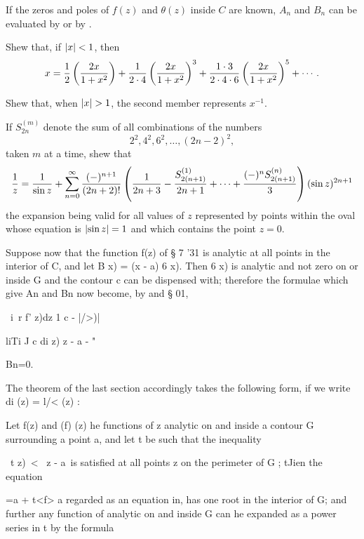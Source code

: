 If the zeros and poles of $f(z)$ and $\theta(z)$ inside $C$ are known,
$A_{n}$ and $B_{n}$ can be evaluated by or
by .

\begin{wandwexample}
  Shew that, if $\left| x \right| < 1$, then
  $$
  x
  =
  \frac{1}{2} \left(  \frac{2x}{1+x^{2}}  \right)
  +
  \frac{1}{2 \cdot 4} \left(  \frac{2x}{1+x^{2}}  \right)^{3}
  +
  \frac{1\cdot 3}{2 \cdot 4 \cdot 6} \left(  \frac{2x}{1+x^{2}}  \right)^{5}
  +
  \cdots.
  $$
  
  Shew that, when $\left| x \right| > 1$, the second member represents $x^{-1}$.
\end{wandwexample}
If $S^{(m)}_{2n}$ denote the sum of all combinations of the numbers
$$
2^{2}, 4^{2}, 6^{2}, \ldots, (2n-2)^{2},
$$
taken $m$ at a time, shew that
$$
\frac{1}{z}
=
\frac{1}{\sin z}
+
\sum_{n=0}^{\infty}
\frac{(-)^{n+1}}{ (2n+2)! }
\left( 
  \frac{1}{2n+3}
  - \frac{S^{(1)}_{2(n+1)}}{2n+1}
  + \cdots
  + \frac{ (-)^{n} S^{(n)}_{2(n+1)}}{3}
 \right)
(\sin z)^{2n+1}
$$
the expansion being valid for all values of $z$ represented by points
within the oval whose equation is $\left| \sin z \right| = 1$ and which contains the
point $z = 0$. 


Suppose now that the function f(z) of § 7 '31 is analytic at all
points in the interior of C, and let B x) = (x - a) 6 x). Then 6 x) is
analytic and not zero on or inside G and the contour c can be
dispensed with; therefore the formulae which give An and Bn now
become, by and § 01,

\ i\ r f' z)dz 1 c - |/>)|

liTi J c di z) z - a - "

Bn=0.

%
%

The theorem of the last section accordingly takes the following form,
if we write di (z) = l/< (z) :

Let f(z) and (f) (z) he functions of z analytic on and inside a
contour G surrounding a point a, and let t be such that the inequality

\ t z)\ < \ z - a\ is satisfied at all points z on the perimeter of G
; tJien the equation

 =a + t<f> a regarded as an equation in, has one root in the interior
of G; and further any function of analytic on and inside G can he
expanded as a power series in t by the formula

